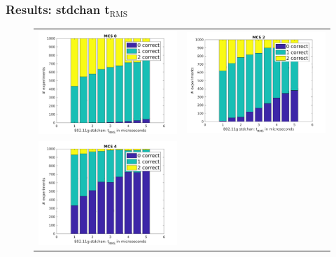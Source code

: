 \documentclass[accentcolor=tud8b,colorbacktitle]{tudbeamer}
\begin{document}
\begin{frame}
\frametitle{Results: stdchan t$_\text{RMS}$}
\begin{figure}[H]
	\centering
	\vspace{-0.5cm}
	\begin{tabular}{cc}
		\includegraphics[height=0.52\textheight]{../../gfx/plots/trms-mcs0} &
		\includegraphics[height=0.52\textheight]{../../gfx/plots/trms-mcs2} \\
		\includegraphics[height=0.52\textheight]{../../gfx/plots/trms-mcs4} &

\end{tabular}
\end{figure}
\end{frame}
\end{document}
